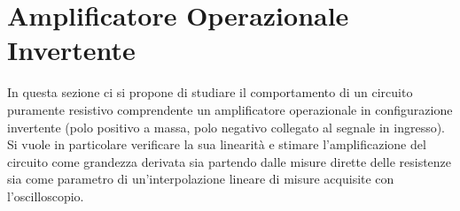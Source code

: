 \documentclass[a4paper,11pt]{article} %
\begin{document}
%			
%			
%			
%			
%
%
%		
%
%			
%			
%
%			
%			
%
%	



\section{Amplificatore Operazionale Invertente}
In questa sezione ci si propone di studiare il comportamento di un circuito puramente resistivo comprendente un
amplificatore operazionale in configurazione invertente (polo positivo a massa, polo negativo collegato al segnale in
ingresso). Si vuole in particolare verificare la sua linearità e stimare l'amplificazione del circuito come grandezza
derivata sia partendo dalle misure dirette delle resistenze sia come parametro di un'interpolazione lineare di misure
acquisite con l'oscilloscopio. 
\end{document}
